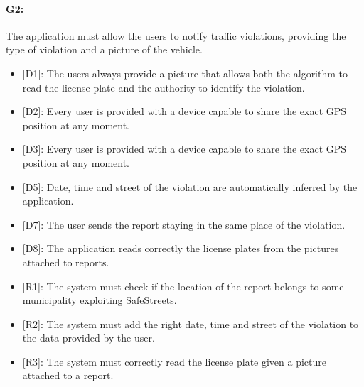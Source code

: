 \documentclass[12pt,a4paper]{report}
\begin{document}
			\paragraph {G2:} The application must allow the users to notify traffic violations, providing the type of violation and a picture of the vehicle.
		\begin{itemize}
			\item{[D1]:} The users always provide a picture that allows both the algorithm to read the license plate and the authority to identify the violation.
			\item{[D2]:} Every user is provided with a device capable to share the exact GPS position at any moment.
			\item{[D3]:} Every user is provided with a device capable to share the exact GPS position at any moment.
			\item{[D5]:} Date, time and street of the violation are automatically inferred by the application.
			\item{[D7]:} The user sends the report staying in the same place of the violation.
	 		\item{[D8]:} The application reads correctly the license plates from the pictures attached to reports.
		\end{itemize}
		\begin{itemize}
			\item{[R1]:} The system must check if the location of the report belongs to some municipality exploiting SafeStreets.
			\item{[R2]:} The system must add the right date, time and street of the violation to the data provided by the user.
			\item{[R3]:} The system must correctly read the license plate given a picture attached to a report.
		\end{itemize}
\end{document}
